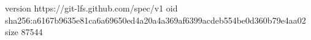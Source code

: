 version https://git-lfs.github.com/spec/v1
oid sha256:a6167b9635e81ca6a69650ed4a20a4a369af6399acdeb554be0d360b79e4aa02
size 87544
